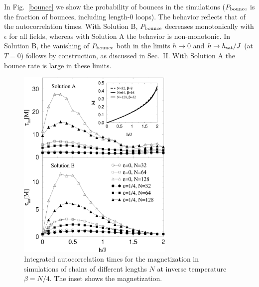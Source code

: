 \documentclass[10pt,pre,aps,twocolumn,showpacs,superscriptaddress,
floatfix]{revtex4}
\begin{document}
In Fig.~\ref{bounce} we show the probability of bounces in the simulations 
($P_{\rm bounce}$ is the fraction of bounces, including length-$0$ 
loops). The behavior reflects that of the autocorrelation times. With Solution
B, $P_{\rm bounce}$ decreases monotonically with $\epsilon$ for all fields,
whereas with Solution A the behavior is non-monotonic. In Solution B, the 
vanishing of $P_{\rm bounce}$  both in the limits $h \to 0$ and 
$h \to h_{\rm sat}/J$ (at $T=0$) follows by construction, as discussed in
Sec.~II. With Solution A the bounce rate is large in these limits.

\begin{figure}
\includegraphics[clip,width=7.5cm]{fig16.eps}
\caption{Integrated autocorrelation times for the magnetization in 
simulations of chains of different lengths $N$ at inverse temperature 
$\beta=N/4$. The inset shows the magnetization.}
\label{mltau}
\end{figure}
\end{document}
